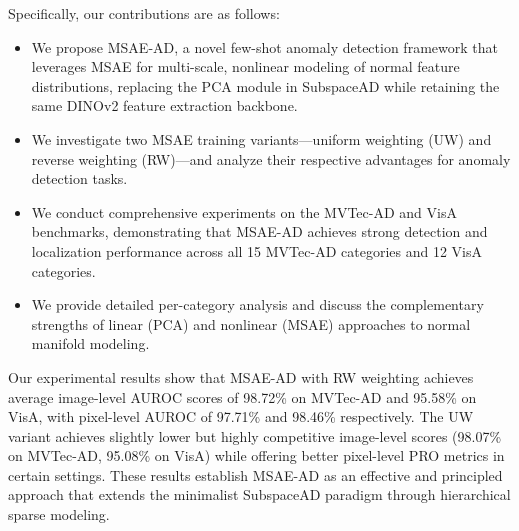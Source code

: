 Specifically, our contributions are as follows:
\begin{itemize}
    \item We propose MSAE-AD, a novel few-shot anomaly detection framework that leverages MSAE for multi-scale, nonlinear modeling of normal feature distributions, replacing the PCA module in SubspaceAD while retaining the same DINOv2 feature extraction backbone.
    \item We investigate two MSAE training variants---uniform weighting (UW) and reverse weighting (RW)---and analyze their respective advantages for anomaly detection tasks.
    \item We conduct comprehensive experiments on the MVTec-AD and VisA benchmarks, demonstrating that MSAE-AD achieves strong detection and localization performance across all 15 MVTec-AD categories and 12 VisA categories.
    \item We provide detailed per-category analysis and discuss the complementary strengths of linear (PCA) and nonlinear (MSAE) approaches to normal manifold modeling.
\end{itemize}

Our experimental results show that MSAE-AD with RW weighting achieves average image-level AUROC scores of 98.72\% on MVTec-AD and 95.58\% on VisA, with pixel-level AUROC of 97.71\% and 98.46\% respectively.
The UW variant achieves slightly lower but highly competitive image-level scores (98.07\% on MVTec-AD, 95.08\% on VisA) while offering better pixel-level PRO metrics in certain settings.
These results establish MSAE-AD as an effective and principled approach that extends the minimalist SubspaceAD paradigm through hierarchical sparse modeling.

